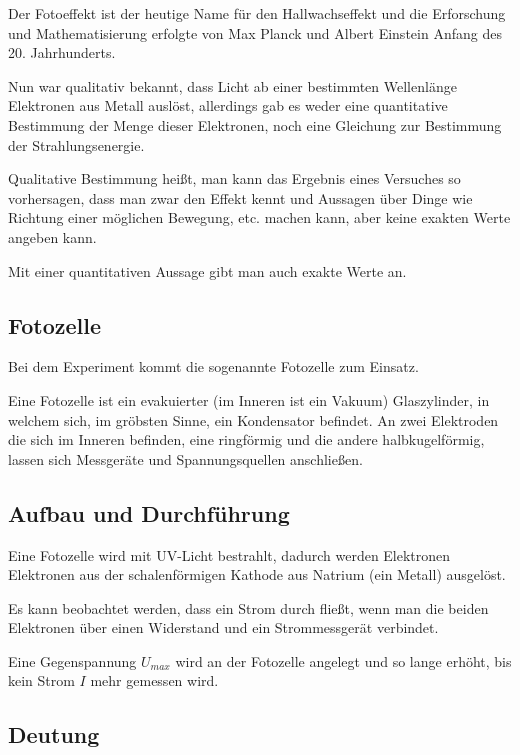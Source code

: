 Der Fotoeffekt ist der heutige Name für den Hallwachseffekt und die Erforschung und Mathematisierung erfolgte von Max Planck und Albert Einstein Anfang des 20. Jahrhunderts.

Nun war qualitativ bekannt, dass Licht ab einer bestimmten Wellenlänge Elektronen aus Metall auslöst, allerdings gab es weder eine quantitative Bestimmung der Menge dieser Elektronen, noch eine Gleichung zur Bestimmung der Strahlungsenergie.

\begin{NiceToKnow}
	Qualitative Bestimmung heißt, man kann das Ergebnis eines Versuches so vorhersagen, dass man zwar den Effekt kennt und Aussagen über Dinge wie Richtung einer möglichen Bewegung, etc. machen kann, aber keine exakten Werte angeben kann.
	
	Mit einer quantitativen Aussage gibt man auch exakte Werte an.
\end{NiceToKnow}


\subsection{Fotozelle}

Bei dem Experiment kommt die sogenannte Fotozelle zum Einsatz.

Eine Fotozelle ist ein evakuierter (im Inneren ist ein Vakuum) Glaszylinder, in welchem sich, im gröbsten Sinne, ein Kondensator befindet. An zwei Elektroden die sich im Inneren befinden, eine ringförmig und die andere halbkugelförmig, lassen sich Messgeräte und Spannungsquellen anschließen.

\subsection{Aufbau und Durchführung}

Eine Fotozelle wird mit UV-Licht bestrahlt, dadurch werden Elektronen Elektronen aus der schalenförmigen Kathode aus Natrium (ein Metall) ausgelöst. 

Es kann beobachtet werden, dass ein Strom durch fließt, wenn man die beiden Elektronen über einen Widerstand und ein Strommessgerät verbindet.

Eine Gegenspannung $U_{max}$ wird an der Fotozelle angelegt und so lange erhöht, bis kein Strom $I$ mehr gemessen wird.


\subsection{Deutung}

